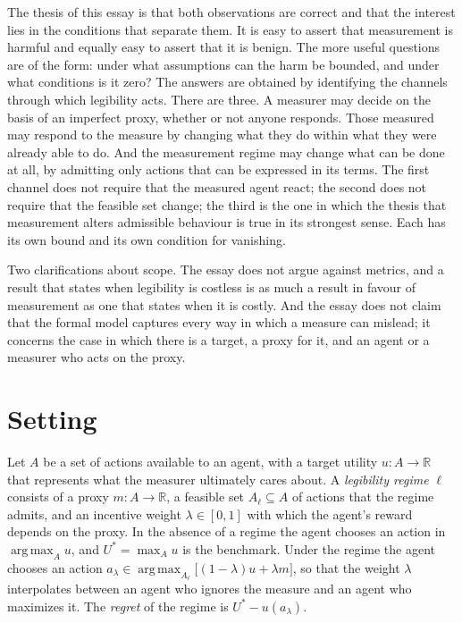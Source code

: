 \documentclass[11pt]{article}
\theoremstyle{remark}
\newcommand{\argmax}{\operatorname*{arg\,max}}
\begin{document}
The thesis of this essay is that both observations are correct and that the interest lies in the conditions that separate them. It is easy to assert that measurement is harmful and equally easy to assert that it is benign. The more useful questions are of the form: under what assumptions can the harm be bounded, and under what conditions is it zero? The answers are obtained by identifying the channels through which legibility acts. There are three. A measurer may decide on the basis of an imperfect proxy, whether or not anyone responds. Those measured may respond to the measure by changing what they do within what they were already able to do. And the measurement regime may change what can be done at all, by admitting only actions that can be expressed in its terms. The first channel does not require that the measured agent react; the second does not require that the feasible set change; the third is the one in which the thesis that measurement alters admissible behaviour is true in its strongest sense. Each has its own bound and its own condition for vanishing.

Two clarifications about scope. The essay does not argue against metrics, and a result that states when legibility is costless is as much a result in favour of measurement as one that states when it is costly. And the essay does not claim that the formal model captures every way in which a measure can mislead; it concerns the case in which there is a target, a proxy for it, and an agent or a measurer who acts on the proxy.

\section{Setting}

Let $A$ be a set of actions available to an agent, with a target utility $u:A\to\mathbb R$ that represents what the measurer ultimately cares about. A \emph{legibility regime} $\ell$ consists of a proxy $m:A\to\mathbb R$, a feasible set $A_\ell\subseteq A$ of actions that the regime admits, and an incentive weight $\lambda\in[0,1]$ with which the agent's reward depends on the proxy. In the absence of a regime the agent chooses an action in $\argmax_A u$, and $U^\ast=\max_A u$ is the benchmark. Under the regime the agent chooses an action $a_\lambda\in\argmax_{A_\ell}\bigl[(1-\lambda)u+\lambda m\bigr]$, so that the weight $\lambda$ interpolates between an agent who ignores the measure and an agent who maximizes it. The \emph{regret} of the regime is $U^\ast-u(a_\lambda)$.
\end{document}
